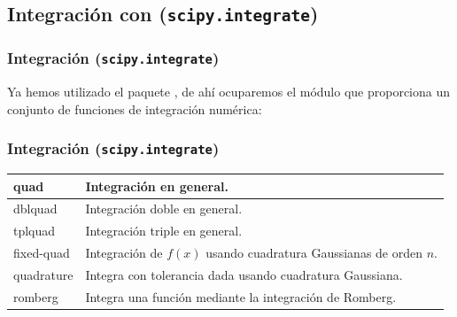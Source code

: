 \subsection{Integración con (\texttt{scipy.integrate})}
\begin{frame}
\frametitle{Integración (\texttt{scipy.integrate})}
Ya hemos utilizado el paquete , de ahí ocuparemos el módulo  que proporciona un conjunto de funciones de integración numérica:
\end{frame}
\begin{frame}
\frametitle{Integración (\texttt{scipy.integrate})}
\fontsize{12}{12}\selectfont
\begin{tabular}{l | p{8cm}}
quad 		& Integración en general. \\ \hline
dblquad 	& Integración doble en general. \\ \hline
tplquad 	& Integración triple en general. \\ \hline
fixed-quad 	& Integración de $f(x)$ usando cuadratura Gaussianas de orden $n$. \\ \hline
quadrature 	& Integra con tolerancia dada usando cuadratura Gaussiana. \\ \hline
romberg 	& Integra una función mediante la integración de Romberg.
\end{tabular}
\end{frame}
